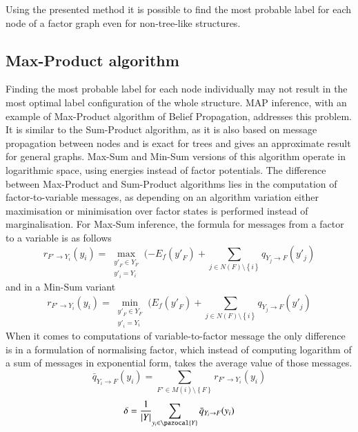 Using the presented method it is possible to find the most probable label for each node of a factor graph even for non-tree-like structures. 

\subsection{Max-Product algorithm }

Finding the most probable label for each node individually may not result in the most optimal label configuration of the whole structure. MAP inference, with an example of Max-Product algorithm of Belief Propagation, addresses this problem. It is similar to the Sum-Product algorithm, as it is also based on message propagation between nodes and is exact for trees and gives an approximate result for general graphs. Max-Sum and Min-Sum versions of this algorithm operate in logarithmic space, using energies instead of factor potentials. The difference between Max-Product and Sum-Product algorithms lies in the computation of factor-to-variable messages, as depending on an algorithm variation either maximisation or minimisation over factor states is performed instead of marginalisation. For Max-Sum inference, the formula for messages from a factor to a variable is as follows
\begin{equation}
   r_{F' \rightarrow Y_i}(y_i) = 
       \max_{\substack{{y'}_{F}\in Y_{F}                               \\ {y'}_i = Y_i}}
       {(-E_f({y'}_F) + \sum_{j \in N (F) \setminus \left \{ i \right \}}
            {q_{Y_j\rightarrow F}({y'}_j)}}
\end{equation}
and in a Min-Sum variant
\begin{equation}
   r_{F' \rightarrow Y_i}(y_i) = 
       \min_{\substack{{y'}_{F}\in Y_{F}                               \\ {y'}_i = Y_i}}
       {(E_f({y'}_F) + \sum_{j \in N (F) \setminus \left \{ i \right \}}
            {q_{Y_j\rightarrow F}({y'}_j)}}
\end{equation}
When it comes to computations of variable-to-factor message the only difference is in a formulation of normalising factor, which instead of computing logarithm of a sum of messages in exponential form, takes the average value of those messages. 
\begin{equation}
    \bar{q}_{Y_i\rightarrow F}(y_i) = \sum_{F' \in M(i) \setminus \left \{ F \right \} }{ r_{F' \rightarrow Y_i}(y_i)}
\end{equation}
\begin{equation}
    \delta = \frac{1}{\left |Y \right |}{\sum_{y_i \in \pazocal{Y}}{\bar{q}_{Y_i\rightarrow F}(y_i)}}
\end{equation}
